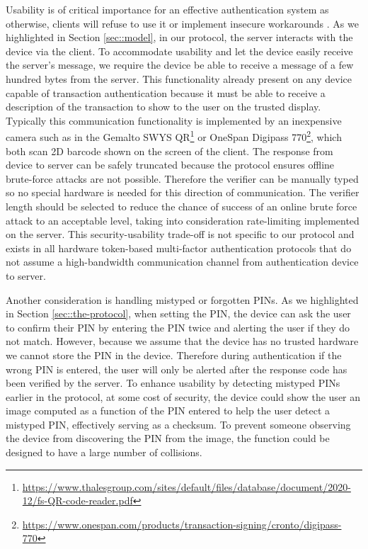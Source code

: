 \documentclass[runningheads]{llncs}
\begin{document}
Usability is of critical importance for an effective authentication system as otherwise, clients will refuse to use it or implement insecure workarounds \cite{de2013comparative}.
As we highlighted in Section \ref{sec::model}, in our protocol, the server interacts with the device via the client. To accommodate usability and let the device easily receive the server's message, we require the device be able to receive a message of a few hundred bytes from the server. This functionality already present on any device capable of transaction authentication because it must be able to receive a description of the transaction to show to the user on the trusted display. Typically this communication functionality is implemented by an inexpensive camera such as in the Gemalto SWYS QR\footnote{\url{https://www.thalesgroup.com/sites/default/files/database/document/2020-12/fs-QR-code-reader.pdf}} or OneSpan Digipass 770\footnote{\url{https://www.onespan.com/products/transaction-signing/cronto/digipass-770}}, which both scan 2D barcode shown on the screen of the client. 
The response from device to server can be safely truncated because the protocol ensures offline brute-force attacks are not possible. Therefore the verifier can be manually typed so no special hardware is needed for this direction of communication. The verifier length should be selected to reduce the chance of success of an online brute force attack to an acceptable level, taking into consideration rate-limiting implemented on the server. This security-usability trade-off is not specific to our protocol and exists in all hardware token-based multi-factor authentication protocols that do not assume a high-bandwidth communication channel from authentication device to server. 

Another consideration is handling mistyped or forgotten PINs. As we highlighted in Section \ref{sec::the-protocol}, when setting the PIN, the device can ask the user to confirm their PIN by entering the PIN twice and alerting the user if they do not match. However, because we assume that the device has no trusted hardware we cannot store the PIN in the device. Therefore during authentication if the wrong PIN is entered, the user will only be alerted after the response code has been verified by the server. To enhance usability by detecting mistyped PINs earlier in the protocol, at some cost of security, the device could show the user an image computed as a function of the PIN entered to help the user detect a mistyped PIN, effectively serving as a checksum. To prevent someone observing the device from discovering the PIN from the image, the function could be designed to have a large number of collisions.











\appendix

%

%







%
\end{document}

